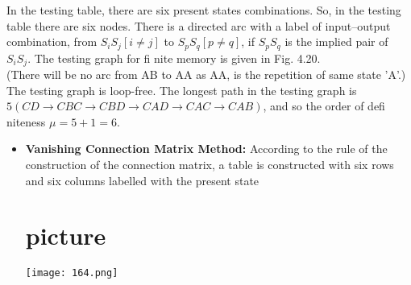 \documentclass[9pt]{beamer}
\begin{document}
\begin{frame}
\small{
\begin{multicols}{2}
In the testing table, there are six present states combinations. So, in the testing table there are six
nodes. There is a directed arc with a label of
input–output combination, from $S_iS_j [i \neq j]$ to $S_pS_q
[p \neq q]$, if $S_pS_q$ is the implied pair of $S_iS_j$. The testing
graph for fi nite memory is given in Fig. 4.20.\\
\hspace*{0.5cm} (There will be no arc from AB to AA as AA, is
the repetition of same state 'A'.)\\
\hspace{0.5cm} The testing graph is loop-free. The longest
path in the testing graph is $5 (CD \rightarrow C BC \rightarrow C BD
\rightarrow C AD \rightarrow C AC \rightarrow C AB)$, and so the order of defi niteness
$\mu = 5 + 1 = 6.$\\
\begin{itemize}
  \item \textbf{Vanishing Connection Matrix Method:} According
to the rule of the construction of the connection
matrix, a table is constructed with six rows
and six columns labelled with the present state\\

\section{picture}
\texttt{[image: 164.png]}

\end{itemize}
\end{multicols}
}
\end{frame}
\end{document}
